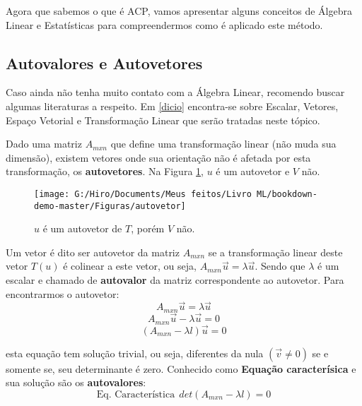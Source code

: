\documentclass[
]{book}
\begin{document}
Agora que sabemos o que é ACP, vamos apresentar alguns conceitos de Álgebra Linear e Estatísticas para compreendermos como é aplicado este método.

\hypertarget{autovalores-e-autovetores}{%
\subsection{Autovalores e Autovetores}\label{autovalores-e-autovetores}}

Caso ainda não tenha muito contato com a Álgebra Linear, recomendo buscar algumas literaturas a respeito. Em \ref{dicio} encontra-se sobre Escalar, Vetores, Espaço Vetorial e Transformação Linear que serão tratadas neste tópico.

Dado uma matriz \(A_{mxn}\) que define uma transformação linear (não muda sua dimensão), existem vetores onde sua orientação não é afetada por esta transformação, os \textbf{autovetores}. Na Figura \ref{fig:autovetor}, \(u\) é um autovetor e \(V\) não.

\begin{figure}

{\centering \texttt{[image: G:/Hiro/Documents/Meus feitos/Livro ML/bookdown-demo-master/Figuras/autovetor]} 

}

\caption{\(u\) é um autovetor de \(T\), porém \(V\) não.}\label{fig:autovetor}
\end{figure}



Um vetor é dito ser autovetor da matriz \(A_{mxn}\) se a transformação linear deste vetor \(T(u)\) é colinear a este vetor, ou seja, \(A_{mxn}\vec{u}=\lambda \vec{u}\). Sendo que \(\lambda\) é um escalar e chamado de \textbf{autovalor} da matriz correspondente ao autovetor. Para encontrarmos o autovetor:
\[A_{mxn}\vec{u}=\lambda \vec{u} \]
\[A_{mxn}\vec{u}-\lambda \vec{u}=0 \]
\begin{equation}
(A_{mxn}-\lambda l)\vec{u}=0
    \label{eq:autovetor}
\end{equation}

esta equação tem solução trivial, ou seja, diferentes da nula \((\vec{v}\neq 0 )\) se e somente se, seu determinante é zero. Conhecido como \textbf{Equação caracterísica} e sua solução são os \textbf{autovalores}:
\begin{equation}
    \mbox{Eq. Característica}\ \  det(A_{mxn}-\lambda l)=0  
    \label{eq:eqcarac}
\end{equation}
\end{document}
